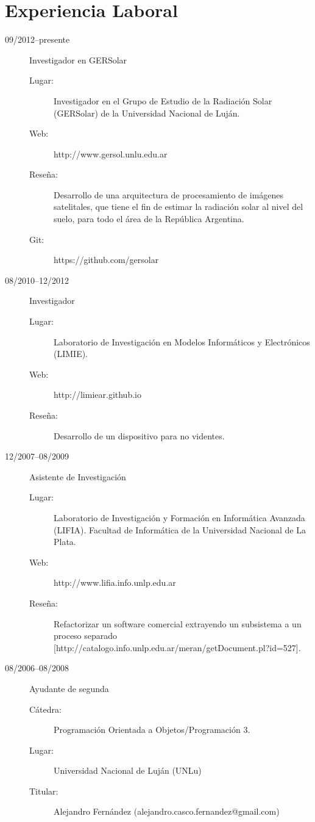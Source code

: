 \documentclass[a4paper]{article}
\begin{document}
\section{Experiencia Laboral}
\begin{description}
\item[09/2012--presente] Investigador en GERSolar
	\begin{description}
	\item[Lugar: ] Investigador en el Grupo de Estudio de la Radiación Solar (GERSolar) de la Universidad Nacional de Luján.
	\item[Web: ] http://www.gersol.unlu.edu.ar
	\item[Reseña: ]  Desarrollo de una arquitectura de procesamiento de imágenes satelitales, que tiene el fin  de estimar la radiación solar al nivel del suelo, para todo el área de la República Argentina.
	\item[Git: ] https://github.com/gersolar
	\end{description}
\item[08/2010--12/2012] Investigador
	\begin{description}
	\item[Lugar: ] Laboratorio de Investigación en Modelos Informáticos y Electrónicos (LIMIE).
	\item[Web: ] http://limiear.github.io
	\item[Reseña: ] Desarrollo de un dispositivo para no videntes.
	\end{description}
\item[12/2007--08/2009] Asistente de Investigación
	\begin{description}
	\item[Lugar: ] Laboratorio de Investigación y Formación en Informática Avanzada (LIFIA). Facultad de Informática de la Universidad Nacional de La Plata.
	\item[Web: ] http://www.lifia.info.unlp.edu.ar
	\item[Reseña: ] Refactorizar un software comercial extrayendo un subsistema a un proceso separado [http://catalogo.info.unlp.edu.ar/meran/getDocument.pl?id=527].
	\end{description}
\item[08/2006--08/2008] Ayudante de segunda
	\begin{description}
	\item[Cátedra: ] Programación Orientada a Objetos/Programación 3.
	\item[Lugar: ] Universidad Nacional de Luján (UNLu)
	\item[Titular: ] Alejandro Fernández (alejandro.casco.fernandez@gmail.com)

\end{description}
\end{description}
\end{document}
